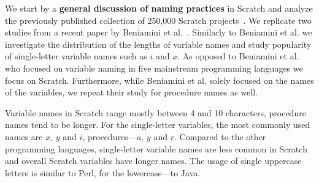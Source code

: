 \documentclass[conference]{IEEEtran}
\newcommand{\todo}[1]{ \textbf{#1} }
\begin{document}
We start by a \textbf{general discussion of naming practices} in Scratch and analyze the previously published collection of 250,000 Scratch projects~\cite{Aivaloglou2016HowKC}. 
We replicate two studies from a recent paper by Beniamini et al.~\cite{Beniamini}.
Similarly to Beniamini et al. we investigate the distribution of the lengths of variable names and study popularity of single-letter variable names such as $i$ and $x$.
As opposed to Beniamini et al. who focused on variable naming in five mainstream programming languages we focus on Scratch.
Furthermore, while Beniamini et al. solely focused on the names of the variables, we repeat their study for procedure names as well.

\begin{mdframed} [nobreak=true]
Variable names in Scratch range mostly between 4 and 10 characters, procedure names tend to be longer. 
For the single-letter variables, the most commonly used names are $x$, $y$ and $i$, procedures---$a$, $y$ and $r$. 
Compared to the other programming languages, single-letter variable names are less common in Scratch and overall Scratch variables have longer names. 
The usage of single uppercase letters is similar to Perl, for the lowercase---to Java.
\end{mdframed}

\end{document}
